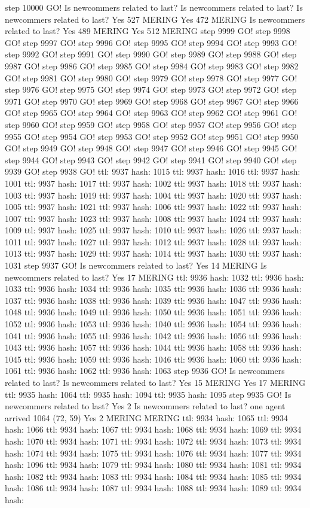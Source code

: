 step 10000 GO! Is newcommers related to last? Is newcommers related to last? Is newcommers related to last? Yes 527 MERING Yes 472 MERING Is newcommers related to last? Yes 489 MERING Yes 512 MERING step 9999 GO! step 9998 GO! step 9997 GO! step 9996 GO! step 9995 GO! step 9994 GO! step 9993 GO! step 9992 GO! step 9991 GO! step 9990 GO! step 9989 GO! step 9988 GO! step 9987 GO! step 9986 GO! step 9985 GO! step 9984 GO! step 9983 GO! step 9982 GO! step 9981 GO! step 9980 GO! step 9979 GO! step 9978 GO! step 9977 GO! step 9976 GO! step 9975 GO! step 9974 GO! step 9973 GO! step 9972 GO! step 9971 GO! step 9970 GO! step 9969 GO! step 9968 GO! step 9967 GO! step 9966 GO! step 9965 GO! step 9964 GO! step 9963 GO! step 9962 GO! step 9961 GO! step 9960 GO! step 9959 GO! step 9958 GO! step 9957 GO! step 9956 GO! step 9955 GO! step 9954 GO! step 9953 GO! step 9952 GO! step 9951 GO! step 9950 GO! step 9949 GO! step 9948 GO! step 9947 GO! step 9946 GO! step 9945 GO! step 9944 GO! step 9943 GO! step 9942 GO! step 9941 GO! step 9940 GO! step 9939 GO! step 9938 GO! ttl: 9937 hash: 1015 ttl: 9937 hash: 1016 ttl: 9937 hash: 1001 ttl: 9937 hash: 1017 ttl: 9937 hash: 1002 ttl: 9937 hash: 1018 ttl: 9937 hash: 1003 ttl: 9937 hash: 1019 ttl: 9937 hash: 1004 ttl: 9937 hash: 1020 ttl: 9937 hash: 1005 ttl: 9937 hash: 1021 ttl: 9937 hash: 1006 ttl: 9937 hash: 1022 ttl: 9937 hash: 1007 ttl: 9937 hash: 1023 ttl: 9937 hash: 1008 ttl: 9937 hash: 1024 ttl: 9937 hash: 1009 ttl: 9937 hash: 1025 ttl: 9937 hash: 1010 ttl: 9937 hash: 1026 ttl: 9937 hash: 1011 ttl: 9937 hash: 1027 ttl: 9937 hash: 1012 ttl: 9937 hash: 1028 ttl: 9937 hash: 1013 ttl: 9937 hash: 1029 ttl: 9937 hash: 1014 ttl: 9937 hash: 1030 ttl: 9937 hash: 1031 step 9937 GO! Is newcommers related to last? Yes 14 MERING Is newcommers related to last? Yes 17 MERING ttl: 9936 hash: 1032 ttl: 9936 hash: 1033 ttl: 9936 hash: 1034 ttl: 9936 hash: 1035 ttl: 9936 hash: 1036 ttl: 9936 hash: 1037 ttl: 9936 hash: 1038 ttl: 9936 hash: 1039 ttl: 9936 hash: 1047 ttl: 9936 hash: 1048 ttl: 9936 hash: 1049 ttl: 9936 hash: 1050 ttl: 9936 hash: 1051 ttl: 9936 hash: 1052 ttl: 9936 hash: 1053 ttl: 9936 hash: 1040 ttl: 9936 hash: 1054 ttl: 9936 hash: 1041 ttl: 9936 hash: 1055 ttl: 9936 hash: 1042 ttl: 9936 hash: 1056 ttl: 9936 hash: 1043 ttl: 9936 hash: 1057 ttl: 9936 hash: 1044 ttl: 9936 hash: 1058 ttl: 9936 hash: 1045 ttl: 9936 hash: 1059 ttl: 9936 hash: 1046 ttl: 9936 hash: 1060 ttl: 9936 hash: 1061 ttl: 9936 hash: 1062 ttl: 9936 hash: 1063 step 9936 GO! Is newcommers related to last? Is newcommers related to last? Yes 15 MERING Yes 17 MERING ttl: 9935 hash: 1064 ttl: 9935 hash: 1094 ttl: 9935 hash: 1095 step 9935 GO! Is newcommers related to last? Yes 2 Is newcommers related to last? one agent arrived 1064 (72, 59) Yes 2 MERING MERING ttl: 9934 hash: 1065 ttl: 9934 hash: 1066 ttl: 9934 hash: 1067 ttl: 9934 hash: 1068 ttl: 9934 hash: 1069 ttl: 9934 hash: 1070 ttl: 9934 hash: 1071 ttl: 9934 hash: 1072 ttl: 9934 hash: 1073 ttl: 9934 hash: 1074 ttl: 9934 hash: 1075 ttl: 9934 hash: 1076 ttl: 9934 hash: 1077 ttl: 9934 hash: 1096 ttl: 9934 hash: 1079 ttl: 9934 hash: 1080 ttl: 9934 hash: 1081 ttl: 9934 hash: 1082 ttl: 9934 hash: 1083 ttl: 9934 hash: 1084 ttl: 9934 hash: 1085 ttl: 9934 hash: 1086 ttl: 9934 hash: 1087 ttl: 9934 hash: 1088 ttl: 9934 hash: 1089 ttl: 9934 hash: 
